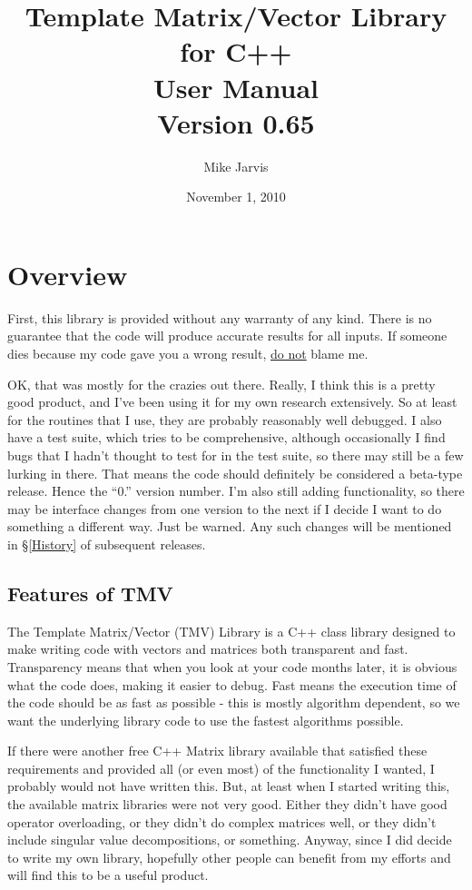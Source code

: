 \documentclass[twoside,letterpaper,11pt]{article}
\newcommand{\tmvversion}{0.65}
\begin{document}
\title{Template Matrix/Vector Library for C++ \\ User Manual \\ Version \tmvversion}
\author{Mike Jarvis}
\date{November 1, 2010}
\maketitle

\tableofcontents

\newpage
\section{Overview}

First, this library is provided without any warranty of any kind.  There is no guarantee
that the code will produce accurate results for all inputs.  If someone dies because
my code gave you a wrong result, \underline{do not} blame me.

OK, that was mostly for the crazies out there.  Really, I think this is a pretty good 
product, and I've been using it for my own research extensively.  So at least 
for the routines that I use, they are probably reasonably well debugged.
I also have a test suite, which tries to be comprehensive, although
occasionally I find bugs that I hadn't thought to test for in the test suite, so 
there may still be a few lurking in there.  That means the code should definitely be considered
a beta-type release.  Hence the ``0.'' version number.  I'm also still adding functionality,
so there may be interface changes from one version to the next if I decide I 
want to do something a different way.  Just be warned.  Any such changes will be 
mentioned in \S\ref{History} of subsequent releases.

\subsection{Features of TMV}

The Template Matrix/Vector (TMV) Library is a C++ class library designed to make
writing code with vectors and matrices both transparent and fast.  Transparency 
means that when you look at your code months later, it is obvious what the code
does, making it easier to debug.  Fast means the execution time of the code should
be as fast as possible - this is mostly algorithm dependent, so we want the 
underlying library code to use the fastest algorithms possible.

If there were another free C++ Matrix library available that satisfied these requirements
and provided all (or even most) of the functionality I wanted, I probably would
not have written this.  But, at least when I started writing this, the available matrix libraries
were not very good.  Either they didn't have good operator overloading, or they 
didn't do complex matrices well, or they didn't include singular value decompositions,
or something.  Anyway, since I did decide to write 
my own library, hopefully other people can benefit from my efforts and will find 
this to be a useful product.
\end{document}
